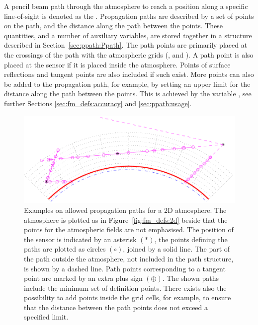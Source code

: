 A pencil beam path through the atmosphere to reach a position along a specific
line-of-sight is denoted as the . Propagation paths
are described by a set of points on the path, and the distance along the path
between the points. These quantities, and a number of auxiliary variables, are
stored together in a structure described in Section~\ref{sec:ppath:Ppath}. The
path points are primarily placed at the crossings of the path with the
atmospheric grids (,  and
). A path point is also placed at the sensor if it is
placed inside the atmosphere. Points of surface reflections and tangent points
are also included if such exist. More points can also be added to the
propagation path, for example, by setting an upper limit for the distance along
the path between the points. This is achieved by the variable
, see further Sections \ref{sec:fm_defs:accuracy} and
\ref{sec:ppath:usage}.

\begin{figure}
 \begin{center}
  \includegraphics*[width=0.95\hsize]{ppath_cases2}
  \caption{Examples on allowed propagation paths for a 2D atmosphere. 
    The atmosphere is plotted as in Figure~\ref{fig:fm_defs:2d} beside
    that the points for the atmospheric fields are not emphasised.
    The position of the sensor is indicated by an asterisk $(\ast)$,
    the points defining the paths are plotted as circles $(\circ)$,
    joined by a solid line. The part of the path outside the
    atmosphere, not included in the path structure, is shown by a
    dashed line. Path points corresponding to a tangent point are
    marked by an extra plus sign $(\oplus)$. The shown paths include
    the minimum set of definition points. There exists also the
    possibility to add points inside the grid cells, for example, to
    ensure that the distance between the path points does not exceed
    a specified limit.}
  \label{fig:fm_defs:ppath_cases2}
 \end{center}
\end{figure}

